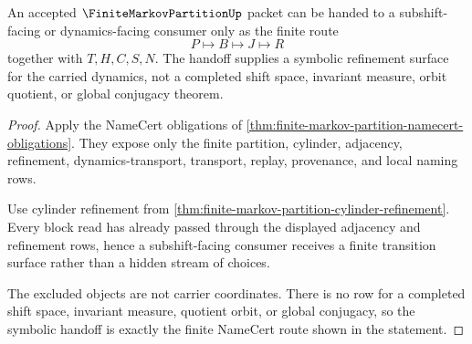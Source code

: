 \begin{theorem}
\label{thm:finite-markov-partition-symbolic-handoff}
An accepted $\FiniteMarkovPartitionUp$ packet can be handed to a subshift-facing or dynamics-facing consumer only as the finite route
$$
P\longmapsto B\longmapsto J\longmapsto R
$$
together with $T,H,C,S,N$. The handoff supplies a symbolic refinement surface for the carried dynamics, not a completed shift space, invariant measure, orbit quotient, or global conjugacy theorem.
\end{theorem}
\begin{proof}
Apply the NameCert obligations of \autoref{thm:finite-markov-partition-namecert-obligations}. They expose only the finite partition, cylinder, adjacency, refinement, dynamics-transport, transport, replay, provenance, and local naming rows.

Use cylinder refinement from \autoref{thm:finite-markov-partition-cylinder-refinement}. Every block read has already passed through the displayed adjacency and refinement rows, hence a subshift-facing consumer receives a finite transition surface rather than a hidden stream of choices.

The excluded objects are not carrier coordinates. There is no row for a completed shift space, invariant measure, quotient orbit, or global conjugacy, so the symbolic handoff is exactly the finite NameCert route shown in the statement.
\end{proof}


\begin{closurestatus}{\FiniteMarkovPartitionUp}
  \theoryclosure{\seedClosure}
  \formalstatus{\unformalizedV}
\end{closurestatus}
